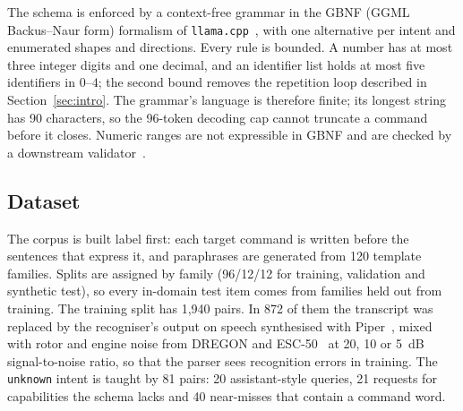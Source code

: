 \documentclass[a4paper,fleqn]{cas-dc}
\begin{document}
The schema is enforced by a context-free grammar in the GBNF (GGML Backus--Naur form) formalism of
\texttt{llama.cpp}~\citep{llamacpp}, with one alternative per intent and enumerated shapes and
directions. Every rule is bounded. A number has at most three integer digits and one decimal, and
an identifier list holds at most five identifiers in $0$--$4$; the second bound removes the
repetition loop described in Section~\ref{sec:intro}. The grammar's language is therefore finite;
its longest string has 90 characters, so the 96-token decoding cap cannot truncate a command
before it closes. Numeric ranges are not expressible in GBNF and are checked by a downstream
validator~\citep{companion}.

\subsection{Dataset}
\label{sec:dataset}

The corpus is built label first: each target command is written before the sentences that express
it, and paraphrases are generated from 120 template families. Splits are assigned by family
(96/12/12 for training, validation and synthetic test), so every in-domain test item comes from
families held out from training. The training split has 1,940 pairs. In 872 of them the
transcript was replaced by the recogniser's output on speech synthesised with Piper~\citep{piper}, mixed with rotor and engine noise from DREGON and ESC-50~\citep{dregon,esc50} at 20,
10 or 5~dB signal-to-noise ratio, so that the parser sees recognition errors in training. The
\texttt{unknown} intent is taught by 81 pairs: 20 assistant-style queries, 21 requests for
capabilities the schema lacks and 40 near-misses that contain a command word.
\end{document}
